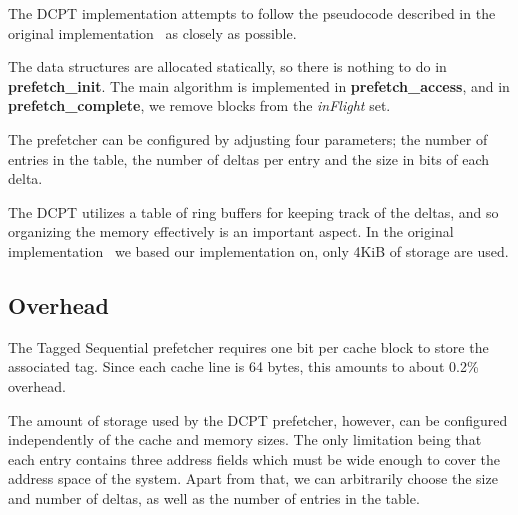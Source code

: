 
The DCPT implementation attempts to follow the pseudocode described in the
original implementation~\cite{dcpt} as closely as possible.

The data structures are allocated statically, so there is nothing to do in
\textbf{prefetch\_init}. The main algorithm is implemented in \textbf{prefetch\_access},
and in \textbf{prefetch\_complete}, we remove blocks from the \emph{inFlight}
set.

The prefetcher can be configured by adjusting four parameters; the number of entries
in the table, the number of deltas per entry and the size in bits of each delta.

The DCPT utilizes a table of ring buffers for keeping track of the deltas, and
so organizing the memory effectively is an important aspect. In the original
implementation~\cite{dcpt} we based our implementation on, only 4KiB of storage
are used.


\subsection{Overhead}

The Tagged Sequential prefetcher requires one bit per cache block to store the
associated tag. Since each cache line is 64 bytes, this amounts to about 0.2\%
overhead.

The amount of storage used by the DCPT prefetcher, however, can be configured
independently of the cache and memory sizes. The only limitation being that each
entry contains three address fields which must be wide enough to cover the
address space of the system. Apart from that, we can arbitrarily choose the size
and number of deltas, as well as the number of entries in the table.
